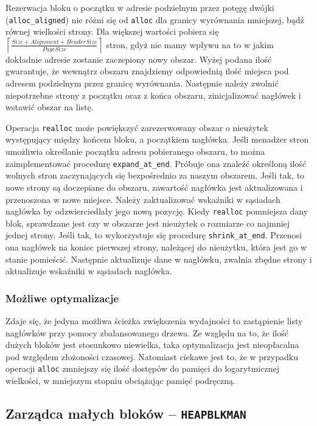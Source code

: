 \documentclass[12pt,a4paper,titlepage,twoside]{mwart}
\begin{document}
Rezerwacja bloku o początku w adresie podzielnym przez potęgę dwójki
(\verb+alloc_aligned+) nie różni się od \verb+alloc+ dla granicy wyrównania
mniejszej, bądź równej wielkości strony. Dla większej wartości pobiera się 
$\left\lceil\frac{Size + Alignment + HeaderSize}{PageSize}\right\rceil$
stron, gdyż nie mamy wpływu na to w jakim dokładnie adresie zostanie zaczepiony
nowy obszar. Wyżej podana ilość gwarantuje, że wewnątrz obszaru znajdziemy
odpowiednią ilość miejsca pod adresem podzielnym przez granicę wyrównania.
Następnie należy zwolnić niepotrzebne strony z początku oraz z końca obszaru,
zinicjalizować nagłówek i wstawić obszar na listę.

Operacja \verb+realloc+ może powiększyć zarezerwowany obszar o nieużytek
występujący między końcem bloku, a początkiem nagłówka. Jeśli menadżer stron
umożliwia określanie początku adresu pobieranego obszaru, to można
zaimplementować procedurę \verb+expand_at_end+. Próbuje ona znaleźć określoną
ilość wolnych stron zaczynających się bezpośrednio za naszym obszarem. Jeśli
tak, to nowe strony są doczepiane do obszaru, zawartość nagłówka jest
aktualizowana i przenoszona w nowe miejsce. Należy zaktualizować wskaźniki w
sąsiadach nagłówka by odzwierciedlały jego nową pozycję. Kiedy \verb+realloc+
pomniejsza dany blok, sprawdzane jest czy w obszarze jest nieużytek o rozmiarze
co najmniej jednej strony. Jeśli tak, to wykorzystuje się procedurę
\verb+shrink_at_end+. Przenosi ona nagłówek na koniec pierwszej strony,
należącej do nieużytku, która jest go w stanie pomieścić. Następnie aktualizuje
dane w nagłówku, zwalnia zbędne strony i aktualizuje wskaźniki w sąsiadach
nagłówka.

\subsubsection{Możliwe optymalizacje}

Zdaje się, że jedyna możliwa ścieżka zwiększenia wydajności to zastąpienie
listy nagłówków przy pomocy zbalansowanego drzewa. Ze względu na to, że ilość
dużych bloków jest stosunkowo niewielka, taka optymalizacja jest nieopłacalna
pod względem złożoności czasowej. Natomiast ciekawe jest to, że w przypadku
operacji \verb+alloc+ zmniejszy się ilość dostępów do pamięci do logarytmicznej
wielkości, w mniejszym stopniu obciążając pamięć podręczną.

\newpage

\subsection{Zarządca małych bloków -- \texttt{HEAPBLKMAN}}
\end{document}

